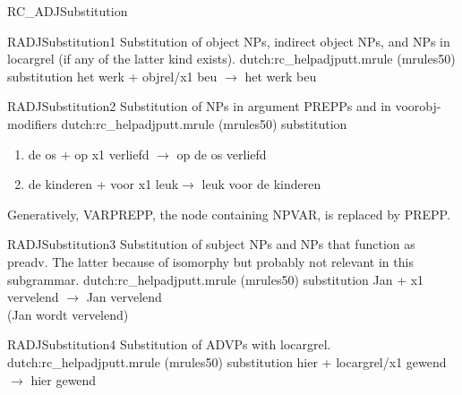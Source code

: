 \begin{mruleclass}{RC\_ADJSubstitution}
\begin{classdescr}

\end{classdescr}

\begin{members}
\begin{member}

 RADJSubstitution1
 Substitution of object NPs, indirect object NPs,
and NPs in locargrel (if any of the latter kind exists).
\file dutch:rc\_helpadjputt.mrule (mrules50)
\semantics substitution
\example het werk + objrel/x1 beu $\rightarrow$ het werk beu
\remarks\mbox{}
\end{member}

\begin{member}
 RADJSubstitution2
 Substitution of NPs in argument PREPPs and in voorobj-modifiers
\file dutch:rc\_helpadjputt.mrule (mrules50)
\semantics substitution
\example \mbox{}
\begin{enumerate}
  \item 
de os + op x1 verliefd $\rightarrow$ op de os verliefd
  \item
de kinderen + voor x1 leuk$\rightarrow$ leuk voor de kinderen
\end{enumerate}
\remarks\mbox{}
Generatively, VARPREPP, the node containing NPVAR, is replaced by PREPP.
 \end{member}

\begin{member}
 RADJSubstitution3
 Substitution of subject NPs and NPs that function as preadv. The 
latter because of isomorphy but  probably not relevant in this subgrammar.
\file dutch:rc\_helpadjputt.mrule (mrules50)
\semantics substitution
\example Jan + x1 vervelend $\rightarrow$ Jan vervelend\\ 
         (Jan wordt vervelend)
\remarks\mbox{}
\end{member}

\begin{member}
 RADJSubstitution4
 Substitution of ADVPs with locargrel.
\file dutch:rc\_helpadjputt.mrule (mrules50)
\semantics substitution
\example hier + locargrel/x1 gewend $\rightarrow$ hier gewend
\remarks\mbox{}

\end{member}
\end{members}
\end{mruleclass}

